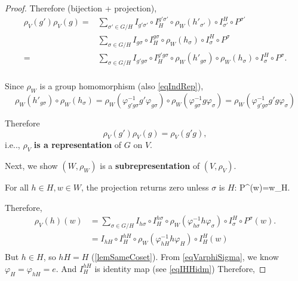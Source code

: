 \documentclass[12pt, letterpaper]{article}
\makeatletter
\newcommand\ie{i.e\@ifnextchar.{}{.\@}}
\newenvironment{eqlong}{\equation\aligned}{\endaligned\endequation}
\theoremstyle{definition}
\theoremstyle{remark}
\theoremstyle{definition}
\theoremstyle{plain}
\numberwithin{equation}{section}
\makeatother
\begin{document}
\begin{proof}
		Therefore (bijection + projection),
		\[\begin{aligned}
			\rho_V(g')\rho_V(g)=&\sum_{\sigma'\in G/H} I_{g'\sigma'}\circ I_{H}^{g'\sigma'}\circ \rho_W(h'_{\sigma'})\circ I^{H}_{\sigma'}\circ P^{\sigma'}\\
			&\sum_{\sigma\in G/H} I_{g\sigma}\circ I_{H}^{g\sigma}\circ \rho_W(h_\sigma)\circ I^{H}_{\sigma}\circ P^\sigma\\
			=&\sum_{\sigma\in G/H} I_{g'g\sigma}\circ I_{H}^{g'g\sigma}\circ \rho_W(h'_{g\sigma})\circ \rho_W(h_\sigma)\circ I^{H}_{\sigma}\circ P^\sigma.\\
		\end{aligned}\]
	
		Since $\rho_W$ is a group homomorphism (also \eqref{eqIndRep}),
		\[ \rho_W(h'_{g\sigma})\circ \rho_W(h_\sigma)= \rho_W(\varphi_{g'g\sigma}^{-1}g'\varphi_{g\sigma})\circ\rho_W(\varphi_{g\sigma}^{-1}g\varphi_{\sigma})=
		 \rho_W(\varphi_{g'g\sigma}^{-1}g'g\varphi_{\sigma})
		\]
		
		Therefore
		\[\rho_V(g')\rho_V(g)=\rho_V(g'g),\]
		\ie, $\rho_V$ \textbf{is a representation} of $G$ on $V$.
		
		Next, we show $(W,\rho_W)$ is a \textbf{subrepresentation} of $(V,\rho_V)$.

		For all $h\in H, w\in W$, the projection returns zero unless $\sigma$ is $H$:
		\begin{eqlong}\label{eqPsigmaw}
		P^\sigma(w)=w\delta_{H\sigma}.
		\end{eqlong}
		
		Therefore,
		\[\begin{aligned}
			\rho_V(h)(w)&=
			\sum_{\sigma\in G/H} I_{h\sigma}\circ I_{H}^{h\sigma}\circ \rho_W(\varphi_{h\sigma}^{-1}h\varphi_{\sigma})\circ I^{H}_{\sigma}\circ P^\sigma(w).\\
			&=
			I_{hH}\circ I_{H}^{hH}\circ \rho_W(\varphi_{hH}^{-1}h\varphi_{H})\circ I_H^H(w)\\
		\end{aligned}\]
		But $h\in H$, so $hH=H$ (\autoref{lemSameCoset}). From \eqref{eqVarphiSigma},
		we know $\varphi_H=\varphi_{hH}=e$.
		And $I_H^{hH}$ is identity map (see \eqref{eqIHHidm})
		Therefore,
	

\end{proof}
\end{document}

